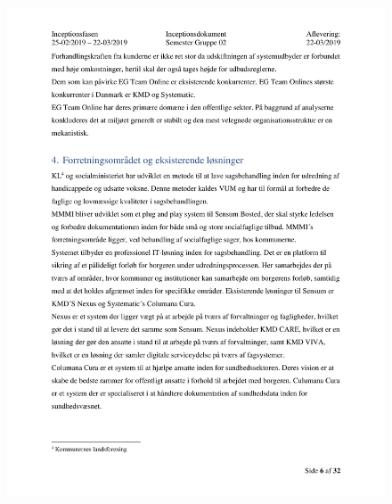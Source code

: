 \begin{figure}[hb]
  \includegraphics[scale = 0.33]{./PNG/Inceptions/Gruppe02+InceptionsDokument-07.jpg} 
\end{figure}

